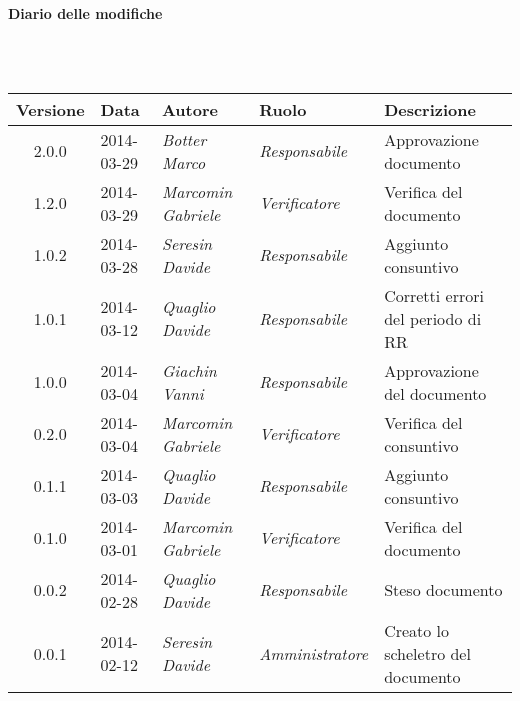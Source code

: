 \noindent\begin{Large}\textbf{Diario delle modifiche}\end{Large}\\
\\
\begin{small}
\begin{tabular}{|c|p{1.8cm}|p{2.8cm}|p{2.8cm}|p{3.5cm}|}
\hline
Versione & Data & Autore & Ruolo & Descrizione \\
\hline
\hline
2.0.0 & 2014-03-29 & 
\textit{Botter Marco} &
\textit{Responsabile} &  Approvazione documento\\
\hline
1.2.0 & 2014-03-29 & 
\textit{Marcomin Gabriele} &
\textit{Verificatore} &  Verifica del documento\\
\hline
\hline
1.0.2 & 2014-03-28 & 
\textit{Seresin Davide} &
\textit{Responsabile} &  Aggiunto consuntivo\\
\hline
1.0.1 & 2014-03-12 & 
\textit{Quaglio Davide} &
\textit{Responsabile} &  Corretti errori del periodo di RR\\
\hline
1.0.0 & 2014-03-04 & 
\textit{Giachin Vanni} &
\textit{Responsabile} &  Approvazione del documento\\
\hline
0.2.0 & 2014-03-04 & 
\textit{Marcomin Gabriele} &
\textit{Verificatore} &  Verifica del consuntivo\\
\hline
0.1.1 & 2014-03-03 & 
\textit{Quaglio Davide} &
\textit{Responsabile} &  Aggiunto consuntivo\\
\hline
0.1.0 & 2014-03-01 & 
\textit{Marcomin Gabriele} &
\textit{Verificatore} &  Verifica del documento \\
\hline
0.0.2 & 2014-02-28 & 
\textit{Quaglio Davide} &
\textit{Responsabile} &  Steso documento\\
\hline
0.0.1 & 2014-02-12 & 
\textit{Seresin Davide} &
\textit{Amministratore} &  Creato lo scheletro del documento\\
\hline
\end{tabular}\\
\end{small}